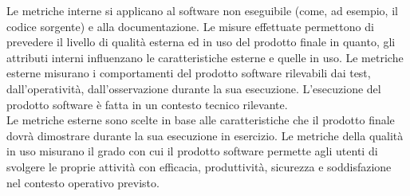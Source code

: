 		Le metriche interne si applicano al software non eseguibile (come, ad esempio, il codice sorgente) e alla documentazione. Le misure effettuate permettono di prevedere il livello di qualità esterna ed in uso del prodotto finale in quanto, gli attributi interni influenzano le caratteristiche esterne e quelle in uso.
		Le metriche esterne misurano i comportamenti del prodotto software rilevabili dai test, dall'operatività, dall'osservazione durante la sua esecuzione. L'esecuzione del prodotto software è fatta in un contesto tecnico rilevante.\\
		Le metriche esterne sono scelte in base alle caratteristiche che il prodotto finale dovrà dimostrare durante la sua esecuzione in esercizio.
		Le metriche della qualità in uso misurano il grado con cui il prodotto software permette agli utenti di svolgere le proprie attività con efficacia, produttività, sicurezza e soddisfazione nel contesto operativo previsto.

